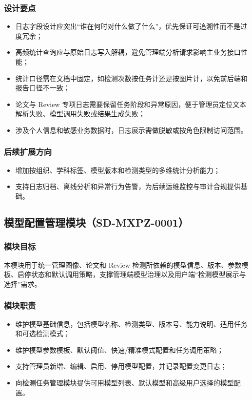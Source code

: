 \subsubsection{设计要点}
\begin{itemize}[leftmargin=2em]
    \item 日志字段设计应突出“谁在何时对什么做了什么”，优先保证可追溯性而不是过度冗余；
    \item 高频统计查询应与原始日志写入解耦，避免管理端分析请求影响主业务接口性能；
    \item 统计口径需在文档中固定，如检测次数按任务计还是按图片计，以免前后端和报告口径不一致；
    \item 论文与 Review 专项日志需要保留任务阶段和异常原因，便于管理员定位文本解析失败、模型调用失败或结果生成失败；
    \item 涉及个人信息和敏感业务数据时，日志展示需做脱敏或按角色限制访问范围。
\end{itemize}

\subsubsection{后续扩展方向}
\begin{itemize}[leftmargin=2em]
    \item 增加按组织、学科标签、模型版本和检测类型的多维统计分析能力；
    \item 支持日志归档、离线分析和异常行为告警，为后续运维监控与审计合规提供基础。
\end{itemize}

\subsection{模型配置管理模块（SD-MXPZ-0001）}

\subsubsection{模块目标}
本模块用于统一管理图像、论文和 Review 检测所依赖的模型信息、版本、参数模板、启停状态和默认调用策略，支撑管理端模型治理以及用户端“检测模型展示与选择”需求。

\subsubsection{模块职责}
\begin{itemize}[leftmargin=2em]
    \item 维护模型基础信息，包括模型名称、检测类型、版本号、能力说明、适用任务和可选检测模式；
    \item 维护模型参数模板、默认阈值、快速/精准模式配置和任务调用策略；
    \item 支持管理员新增、编辑、启用、停用模型配置，并记录配置变更日志；
    \item 向检测任务管理模块提供可用模型列表、默认模型和高级用户选择的模型配置。
\end{itemize}

